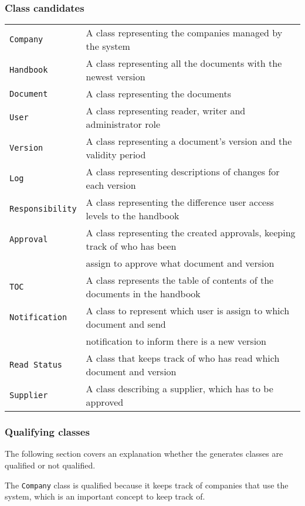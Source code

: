 \subsubsection{Class candidates}
\begin{tabular}{l l}
	\texttt{Company} & A class representing the companies managed by the system \\
	\texttt{Handbook} & A class representing all the documents with the newest version\\
	\texttt{Document} & A class representing the documents\\ %
	\texttt{User }& A class representing reader, writer and administrator role\\
	\texttt{Version} & A class representing a document’s version and the validity period\\
	\texttt{Log} & A class representing descriptions of changes for each version\\
	\texttt{Responsibility} & A class representing the difference user access levels to the handbook\\
	\texttt{Approval} & A class representing the created approvals, keeping track of who has been\\&assign to approve what document and version\\  %
	\texttt{TOC} & A class represents the table of contents of the documents in the handbook\\
	\texttt{Notification} & A class to represent which user is assign to which document and send\\&notification to inform there is a new version\\
	\texttt{Read Status} & A class that keeps track of who has read which document and version\\
	\texttt{Supplier} & A class describing a supplier, which has to be approved
\end{tabular}

\subsubsection{Qualifying classes}
The following section covers an explanation whether the generates classes are qualified or not qualified.

The \texttt{Company} class is qualified because it keeps track of companies that use the system, which is an important concept to keep track of.

